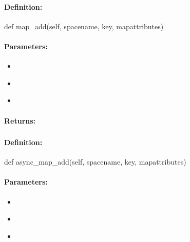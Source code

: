 \paragraph{Definition:}
\begin{pythoncode}
def map_add(self, spacename, key, mapattributes)
\end{pythoncode}

\paragraph{Parameters:}
\begin{itemize}[noitemsep]
\item {}\\

\item {}\\

\item {}\\

\end{itemize}

\paragraph{Returns:}


\pagebreak
\subsubsection{}
\label{api:python:async_map_add}


\paragraph{Definition:}
\begin{pythoncode}
def async_map_add(self, spacename, key, mapattributes)
\end{pythoncode}

\paragraph{Parameters:}
\begin{itemize}[noitemsep]
\item {}\\

\item {}\\

\item {}\\

\end{itemize}

